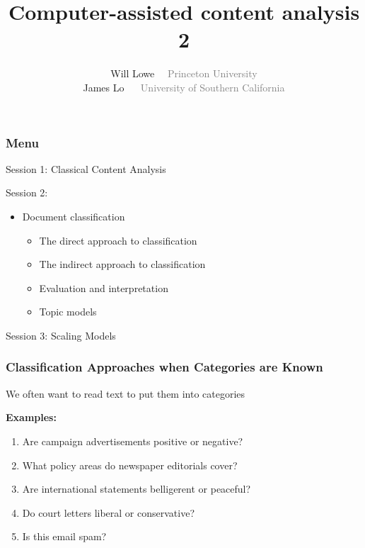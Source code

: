 \documentclass[11pt,compress,professionalfonts]{beamer}
\title{Computer-assisted content analysis 2}
\author{Will Lowe ~~\textcolor{gray}{Princeton University}\\
        James Lo ~~ \textcolor{gray}{University of Southern California}}
\date{}
\newcommand{\ita}{\begin{itemize}}
\newcommand{\itm}{\item[]}
\newcommand{\itz}{\end{itemize}}
\begin{document}
\maketitle

%
%
%
%
%


%

\begin{frame}[t,fragile]\frametitle{Menu}

Session 1: Classical Content Analysis

Session 2:
\ita
\itm Document classification
\ita
\itm The direct approach to classification
\itm The indirect approach to classification
\itm Evaluation and interpretation
\itm Topic models
\itz
\itz

Session 3: Scaling Models

\end{frame}






\begin{frame}[t,fragile]\frametitle{Classification Approaches when Categories are Known}

We often want to read text to put them into categories

{\bf Examples:}

\begin{enumerate}
\item Are campaign advertisements positive or negative?
\item What policy areas do newspaper editorials cover?
\item Are international statements belligerent or peaceful?
\item Do court letters liberal or conservative?
\item Is this email spam?
\end{enumerate}


\end{frame}
\end{document}
